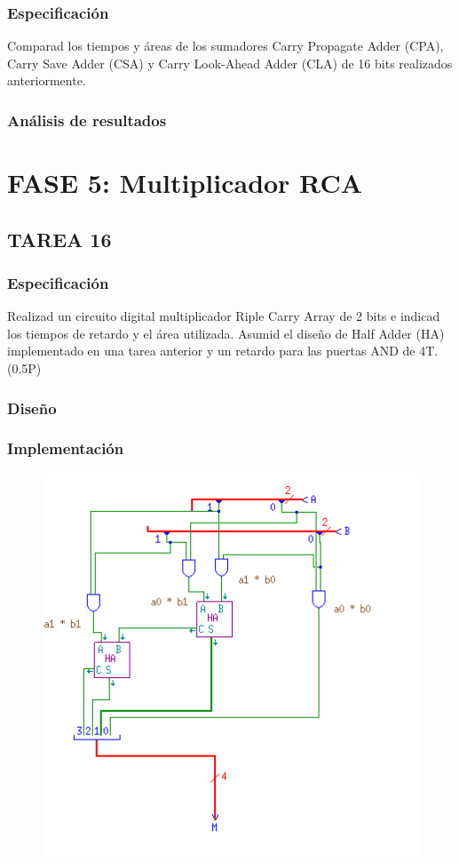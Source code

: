\documentclass{article}
\begin{document}
		\subsubsection*{Especificación}
		Comparad los tiempos y áreas de los sumadores Carry Propagate Adder (CPA), Carry Save Adder (CSA) y Carry Look-Ahead Adder (CLA) de 16 bits realizados anteriormente.

		\subsubsection*{Análisis de resultados}


\section{FASE 5: Multiplicador RCA}

	\subsection{TAREA 16}
		\subsubsection*{Especificación}
		Realizad un circuito digital multiplicador Riple Carry Array de 2 bits e indicad los
		tiempos de retardo y el área utilizada. Asumid el diseño de Half Adder (HA) implementado en una
		tarea anterior y un retardo para las puertas AND de 4T. (0.5P)

		\subsubsection*{Diseño}

		\subsubsection*{Implementación}
		 \begin{figure}[ht]
		 	\includegraphics[width=0.8\linewidth]{RCA2}
		 	\centering
		 \end{figure}
\end{document}
